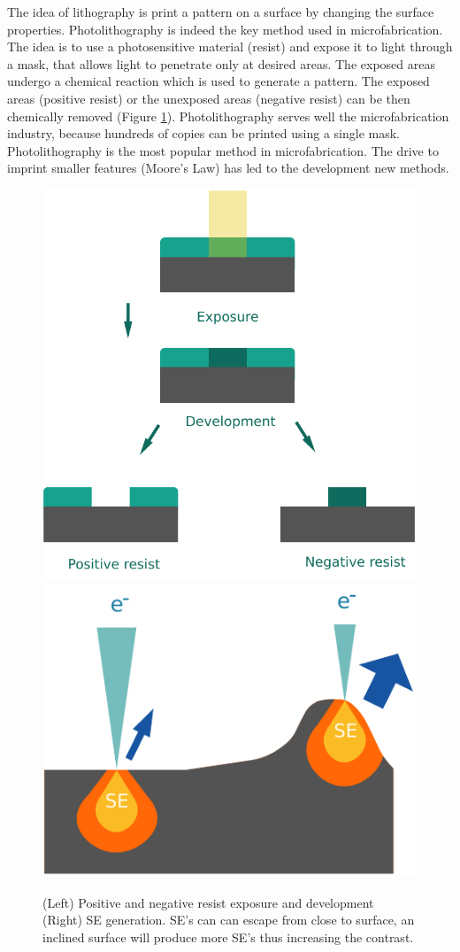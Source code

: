 \documentclass[final]{jyflluk}
\begin{document}
The idea of lithography is print a pattern on a surface by changing the surface properties.  Photolithography is indeed the key method used in microfabrication. The idea is to use a photosensitive material (resist) and expose it to light through a mask, that allows light to penetrate only at desired areas. The exposed areas undergo a chemical reaction which is used to generate a pattern. The exposed areas (positive resist) or the unexposed areas (negative resist) can be then chemically removed (Figure \ref{fig:SEM}).  Photolithography serves well the microfabrication industry, because hundreds of copies can be printed using a single mask. Photolithography is the most popular method in microfabrication. The drive to imprint smaller features (Moore’s Law) has led to the development new methods.
\cite{franssila2010introduction, lee2010microfabrication}


\begin{figure}[h]%
    \centering
    \includegraphics[width=.48\linewidth]{images/pos_neg_resist.pdf}\quad\includegraphics[width=.43\linewidth]{images/SE.pdf}
    \qquad
    \begin{minipage}{1.2in}
    \end{minipage}%
    \caption{(Left) Positive and negative resist exposure and development (Right) SE generation. SE's can can escape from close to surface, an inclined surface will produce more SE's thus increasing the contrast.}%
    \label{fig:SEM}%
\end{figure}
\end{document}
